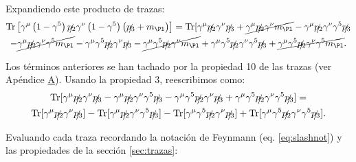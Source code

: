 Expandiendo este producto de trazas:
\begin{multline}
\Tr \left[ \gamma^{\mu } \left(1 -\gamma ^{5}\right) \slashed{p_{2}}\gamma^{\nu }\left( 1-\gamma ^{5}\right) \left( \slashed{p_{3}}+m_{\Pl}\right) \right] = \Tr[ \gamma ^{\mu }\slashed{p_{2}}\gamma ^{\nu }\slashed{p_{3}} + \cancel{\gamma ^{\mu }\slashed{p_{2}}\gamma ^{\nu }m_{\Pl}} -\gamma ^{\mu }\slashed{p_{2}}\gamma ^{\nu }\gamma ^{5}\slashed{p_{3}} \\ - \cancel{\gamma ^{\mu }\slashed{p_{2}}\gamma ^{\nu }\gamma ^{5}m_{\Pl}} -\gamma ^{\mu }\gamma ^{5}\slashed{p_{2}}\gamma ^{\nu }\slashed{p_{3}}- \cancel{\gamma ^{\mu }\gamma ^{5}\slashed{p_{2}}\gamma ^{\nu }m_{\Pl}} +\gamma ^{\mu }\gamma ^{5}\slashed{p_{2}}\gamma ^{\nu }\gamma ^{5}\slashed{p_{3}} + \cancel{\gamma ^{\mu }\gamma ^{5}\slashed{p_{2}}\gamma ^{\nu }\gamma ^{5}m_{\Pl}} .
\end{multline}

Los términos anteriores se han tachado por la propiedad 10 de las trazas (ver Apéndice \hyperref[cap:A]{A}). Usando la propiedad 3, reescribimos como:
\begin{multline}
\operatorname{Tr}[ \gamma ^{\mu }\slashed{p_{2}}\gamma ^{\nu }\slashed{p_{3}} -\gamma ^{\mu }\slashed{p_{2}}\gamma ^{\nu }\gamma ^{5}\slashed{p_{3}} -\gamma ^{\mu }\gamma ^{5}\slashed{p_{2}}\gamma ^{\nu }\slashed{p_{3}} +\gamma ^{\mu }\gamma ^{5}\slashed{p_{2}}\gamma ^{\nu }\gamma ^{5}\slashed{p_{3}}] = \\ \operatorname{Tr}[ \gamma ^{\mu }\slashed{p_{2}}\gamma ^{\nu }\slashed{p_{3}}] - \operatorname{Tr}[\gamma ^{\mu }\slashed{p_{2}}\gamma ^{\nu }\gamma ^{5}\slashed{p_{3}}] - \operatorname{Tr}[\gamma ^{\mu }\gamma ^{5}\slashed{p_{2}}\gamma ^{\nu }\slashed{p_{3}}] + \operatorname{Tr}[\gamma ^{\mu }\gamma ^{5}\slashed{p_{2}}\gamma ^{\nu }\gamma ^{5}\slashed{p_{3}}] .
\end{multline}

Evaluando cada traza recordando la notación de Feynmann (eq. \ref{eq:slashnot}) y las propiedades de la sección \ref{sec:trazas}:

